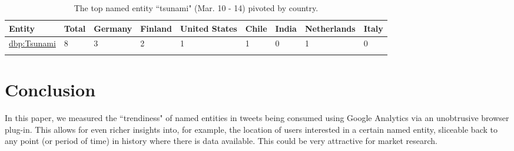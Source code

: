\documentclass[runningheads,a4paper]{llncs}
\begin{document}
\begin{table}[htb!]
\begin{center}
\begin{tabular}{lllllllll}
\hline
Entity & Total & Germany & Finland & United States & Chile & India & Netherlands & Italy \\
\hline
\url{dbp:Tsunami} & 8 & 3 & 2 & 1 & 1 & 0 & 1 & 0 \\
\hline \\
\end{tabular}
\end{center}
\caption{The top named entity ``tsunami" (Mar. 10 - 14) pivoted by country.}
\label{table:pivotbycountry}
\end{table}

\section{Conclusion}\label{sec:conclusion}
In this paper, we measured the ``trendiness" of named entities in tweets being consumed using Google Analytics via an unobtrusive browser plug-in. This allows for even richer insights into, for example, the location of users interested in a certain named entity, sliceable back to any point (or period of time) in history where there is data available. This could be very attractive for market research.




\end{document}
